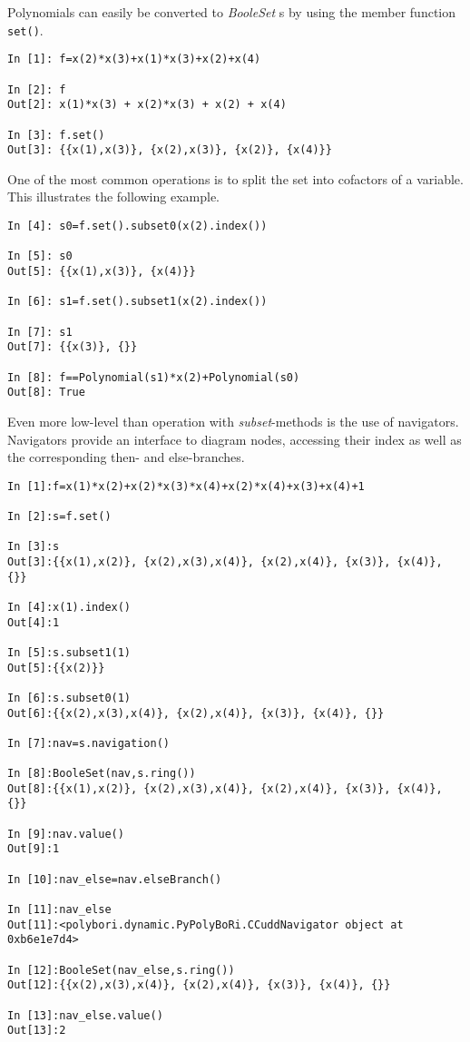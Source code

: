 \documentclass[]{article}
\newcommand{\functionname}[1]{\textit{#1}\xspace}
\begin{document}
Polynomials can easily be converted to \functionname{BooleSet}s by using the
member function \verb|set()|.
\begin{verbatim}
In [1]: f=x(2)*x(3)+x(1)*x(3)+x(2)+x(4)

In [2]: f
Out[2]: x(1)*x(3) + x(2)*x(3) + x(2) + x(4)

In [3]: f.set()
Out[3]: {{x(1),x(3)}, {x(2),x(3)}, {x(2)}, {x(4)}}
\end{verbatim}
%
One of the most common operations is to split the set into cofactors of a
variable. This illustrates the following example.
%
\begin{verbatim}
In [4]: s0=f.set().subset0(x(2).index())

In [5]: s0
Out[5]: {{x(1),x(3)}, {x(4)}}

In [6]: s1=f.set().subset1(x(2).index())

In [7]: s1
Out[7]: {{x(3)}, {}}

In [8]: f==Polynomial(s1)*x(2)+Polynomial(s0)
Out[8]: True
\end{verbatim}
%

Even more low-level than operation with \functionname{subset}-methods is the use
of navigators. Navigators  provide an interface to diagram nodes, accessing
their index as well as the corresponding then- and else-branches.

\begin{verbatim}
In [1]:f=x(1)*x(2)+x(2)*x(3)*x(4)+x(2)*x(4)+x(3)+x(4)+1

In [2]:s=f.set()

In [3]:s
Out[3]:{{x(1),x(2)}, {x(2),x(3),x(4)}, {x(2),x(4)}, {x(3)}, {x(4)}, {}}

In [4]:x(1).index()
Out[4]:1

In [5]:s.subset1(1)
Out[5]:{{x(2)}}

In [6]:s.subset0(1)
Out[6]:{{x(2),x(3),x(4)}, {x(2),x(4)}, {x(3)}, {x(4)}, {}}

In [7]:nav=s.navigation()

In [8]:BooleSet(nav,s.ring())
Out[8]:{{x(1),x(2)}, {x(2),x(3),x(4)}, {x(2),x(4)}, {x(3)}, {x(4)}, {}}

In [9]:nav.value()
Out[9]:1

In [10]:nav_else=nav.elseBranch()

In [11]:nav_else
Out[11]:<polybori.dynamic.PyPolyBoRi.CCuddNavigator object at 0xb6e1e7d4>

In [12]:BooleSet(nav_else,s.ring())
Out[12]:{{x(2),x(3),x(4)}, {x(2),x(4)}, {x(3)}, {x(4)}, {}}

In [13]:nav_else.value()
Out[13]:2
\end{verbatim}
\end{document}
